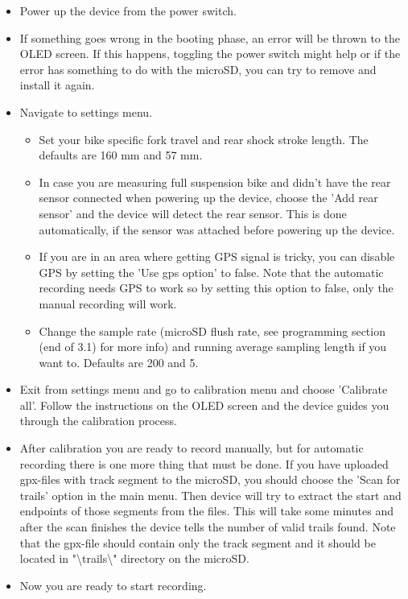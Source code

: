 \documentclass[a4paper,11pt]{article} %
\begin{document}
\begin{itemize}
    \item Power up the device from the power switch.

    \item If something goes wrong in the booting phase, an error will be thrown to the OLED screen. If this happens, toggling the power switch might help or if the error has something to do with the microSD, you can try to remove and install it again.

    \item Navigate to settings menu. 
        \begin{itemize}
            \item Set your bike specific fork travel and rear shock stroke length. The defaults are 160 mm and 57 mm.
            \item In case you are measuring full suspension bike and didn't have the rear sensor connected when powering up the device, choose the 'Add rear sensor' and the device will detect the rear sensor. This is done automatically, if the sensor was attached before powering up the device.
            \item If you are in an area where getting GPS signal is tricky, you can disable GPS by setting the 'Use gps option' to false. Note that the automatic recording needs GPS to work so by setting this option to false, only the manual recording will work.
            \item Change the sample rate (microSD flush rate, see programming section (end of 3.1) for more info) and running average sampling length if you want to. Defaults are 200 and 5.
        \end{itemize}

        \item Exit from settings menu and go to calibration menu and choose 'Calibrate all'.  Follow the instructions on the OLED screen and the device guides you through the calibration process.

        \item After calibration you are ready to record manually, but for automatic recording there is one more thing that must be done. If you have uploaded gpx-files with track segment to the microSD, you should choose the 'Scan for trails' option in the main menu. Then device will try to extract the start and endpoints of those segments from the files. This will take some minutes and after the scan finishes the device tells the number of valid trails found. Note that the gpx-file should contain only the track segment and it should be located in "\textbackslash trails\textbackslash" directory on the microSD.

        \item Now you are ready to start recording.
\end{itemize}
\end{document}
